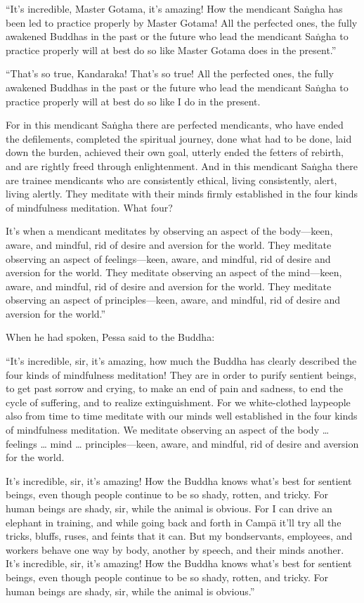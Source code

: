 \documentclass[12pt,openany]{book}%
\begin{document}
“It’s incredible, Master Gotama, it’s amazing! How the mendicant \textsanskrit{Saṅgha} has been led to practice properly by Master Gotama! All the perfected ones, the fully awakened Buddhas in the past or the future who lead the mendicant \textsanskrit{Saṅgha} to practice properly will at best do so like Master Gotama does in the present.” 

“That’s so true, Kandaraka! That’s so true! All the perfected ones, the fully awakened Buddhas in the past or the future who lead the mendicant \textsanskrit{Saṅgha} to practice properly will at best do so like I do in the present. 

For in this mendicant \textsanskrit{Saṅgha} there are perfected mendicants, who have ended the defilements, completed the spiritual journey, done what had to be done, laid down the burden, achieved their own goal, utterly ended the fetters of rebirth, and are rightly freed through enlightenment. And in this mendicant \textsanskrit{Saṅgha} there are trainee mendicants who are consistently ethical, living consistently, alert, living alertly. They meditate with their minds firmly established in the four kinds of mindfulness meditation. What four? 

It’s when a mendicant meditates by observing an aspect of the body—keen, aware, and mindful, rid of desire and aversion for the world. They meditate observing an aspect of feelings—keen, aware, and mindful, rid of desire and aversion for the world. They meditate observing an aspect of the mind—keen, aware, and mindful, rid of desire and aversion for the world. They meditate observing an aspect of principles—keen, aware, and mindful, rid of desire and aversion for the world.” 

When he had spoken, Pessa said to the Buddha: 

“It’s incredible, sir, it’s amazing, how much the Buddha has clearly described the four kinds of mindfulness meditation! They are in order to purify sentient beings, to get past sorrow and crying, to make an end of pain and sadness, to end the cycle of suffering, and to realize extinguishment. For we white-clothed laypeople also from time to time meditate with our minds well established in the four kinds of mindfulness meditation. We meditate observing an aspect of the body … feelings … mind … principles—keen, aware, and mindful, rid of desire and aversion for the world. 

It’s incredible, sir, it’s amazing! How the Buddha knows what’s best for sentient beings, even though people continue to be so shady, rotten, and tricky. For human beings are shady, sir, while the animal is obvious. For I can drive an elephant in training, and while going back and forth in \textsanskrit{Campā} it’ll try all the tricks, bluffs, ruses, and feints that it can. But my bondservants, employees, and workers behave one way by body, another by speech, and their minds another. It’s incredible, sir, it’s amazing! How the Buddha knows what’s best for sentient beings, even though people continue to be so shady, rotten, and tricky. For human beings are shady, sir, while the animal is obvious.” 
\end{document}
